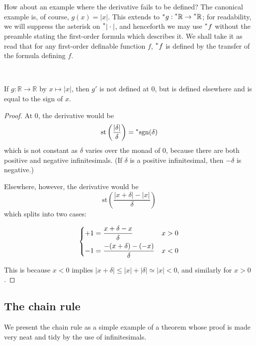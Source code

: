 \documentclass[11pt]{amsart}
\theoremstyle{remark}
\newcommand{\st}{\mathrm{st}}
\newcommand{\hyp}[1][\mathbb{R}]{\prescript{*}{}{#1}}
\newcommand{\near}{\simeq}
\begin{document}
How about an example where the derivative fails to be defined?
The canonical example is, of course, $g(x) = |x|$.
This extends to $\hyp[g]: \hyp \to \hyp$; for readability, we will suppress the asterisk on $\hyp[|]\cdot | $, and henceforth we may use $\hyp[f]$ without the preamble stating the first-order formula which describes it.
We shall take it as read that for any first-order definable function $f$, $\hyp[f]$ is defined by the transfer of the formula defining $f$.

\

\begin{thm}
If $g: \mathbb{R} \to \mathbb{R}$ by $x \mapsto |x|$, then $g'$ is not defined at $0$, but is defined elsewhere and is equal to the sign of $x$.
\end{thm}
\begin{proof}
At $0$, the derivative would be $$\st \left( \frac{|\delta|}{\delta} \right) = \hyp[\text{sgn}](\delta)$$ which is not constant as $\delta$ varies over the monad of $0$, because there are both positive and negative infinitesimals.
(If $\delta$ is a positive infinitesimal, then $-\delta$ is negative.)

Elsewhere, however, the derivative would be $$\st \left( \frac{|x+\delta| - |x|}{\delta} \right)$$
which splits into two cases:

$$\begin{dcases}
+1 = \frac{x+\delta - x}{\delta} & x > 0 \\
-1 = \frac{-(x+\delta) - (-x)}{\delta} & x < 0
\end{dcases}$$

This is because $x < 0$ implies $|x + \delta| \leq |x| + |\delta| \near |x| < 0$, and similarly for $x > 0$.
\end{proof}

\subsection{The chain rule}

We present the chain rule as a simple example of a theorem whose proof is made very neat and tidy by the use of infinitesimals.

\
\end{document}
